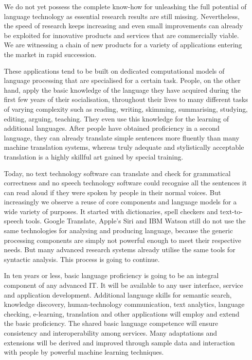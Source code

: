 \documentclass[10pt, plain]{../../metanetpaper}
\begin{document}
\begin{multicols}{2}
We do not yet possess the complete know-how for unleashing the full potential of language technology as essential research results are still missing. Nevertheless, the speed of research keeps increasing and even small improvements can already be exploited for innovative products and services that are commercially viable. We are witnessing a chain of new products for a variety of applications entering the market in rapid succession.

These applications tend to be built on dedicated computational models of language processing that are specialised for a certain task. People, on the other hand, apply the basic knowledge of the language they have acquired during the first few years of their socialisation, throughout their lives to many different tasks of varying complexity such as reading, writing, skimming, summarising, studying, editing, arguing, teaching. They even use this knowledge for the learning of additional languages. After people have obtained proficiency in a second language, they can already translate simple sentences more fluently than many machine translation systems, whereas truly adequate and stylistically acceptable translation is a highly skillful art gained by special training.

Today, no text technology software can translate and check for grammatical correctness and no speech technology software could recognise all the sentences it can read aloud if they were spoken by people in their normal voices. But increasingly we observe a reuse of core components and language models for a wide variety of purposes. It started with dictionaries, spell checkers and text-to-speech tools. Google Translate, Apple's Siri and IBM Watson still do not use the same technologies for analysing and producing language, because the generic processing components are simply not powerful enough to meet their respective needs. But many advanced research systems already utilise the same tools for syntactic analysis. This process is going to continue.

In ten years or less, basic language proficiency is going to be an integral component of any advanced IT. It will be available to any user interface, service and application development. Additional language skills for semantic search, knowledge discovery, human-technology communication, text analytics, language checking, e-learning, translation and other applications will employ and extend the basic proficiency. The shared basic language competence will ensure consistency and interoperability among services. Many adaptations and extensions will be derived and improved through sample data and interaction with people by powerful machine learning techniques.


\end{multicols}
\end{document}
